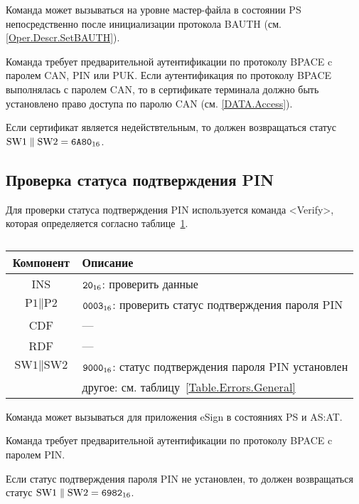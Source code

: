 Команда может вызываться на уровне мастер-файла 
в состоянии PS непосредственно после 
инициализации протокола BAUTH (см. \ref{Oper.Descr.SetBAUTH}).

Команда требует предварительной аутентификации по протоколу BPACE 
c паролем CAN, PIN или PUK. Если аутентификация 
по протоколу BPACE выполнялась с паролем CAN,
то в сертификате терминала должно быть установлено 
право доступа по паролю CAN  (см. \ref{DATA.Access}).

Если сертификат является недействтельным, то должен 
возвращаться статус $\text{SW1} \parallel \text{SW2} = \texttt{6A80}_{16}$.

\subsection{Проверка статуса подтверждения PIN}
\label{Oper.Descr.VerifyAuth}

Для проверки статуса подтверждения PIN
используется команда <Verify>, 
которая определяется согласно 
таблице~\ref{Table.Oper.VerifyAuthCmd}.

\begin{table}[hbt]
\caption{}\label{Table.Oper.VerifyAuthCmd}
\begin{tabular}{|c|p{14cm}|}
\hline
Компонент & Описание \\
\hline
\hline
INS & $\texttt{20}_{16}$: проверить данные\\
\hline
$\text{P1} \parallel \text{P2}$ & $\texttt{0003}_{16}$: проверить статус подтверждения пароля PIN \\
\hline
CDF & --- \\
\hline 
RDF &  --- \\
\hline
$\text{SW1} \parallel \text{SW2}$ & $\texttt{9000}_{16}$: 
 статус подтверждения пароля PIN установлен\\
 & другое: см. таблицу~\ref{Table.Errors.General} \\
\hline
\end{tabular}
\end{table}

Команда может вызываться для приложения eSign в состояниях PS и AS:AT.

Команда требует предварительной аутентификации по протоколу BPACE
c паролем PIN.

Если статус подтверждения пароля PIN не установлен, то должен 
возвращаться статус $\text{SW1} \parallel \text{SW2} = \texttt{6982}_{16}$.

